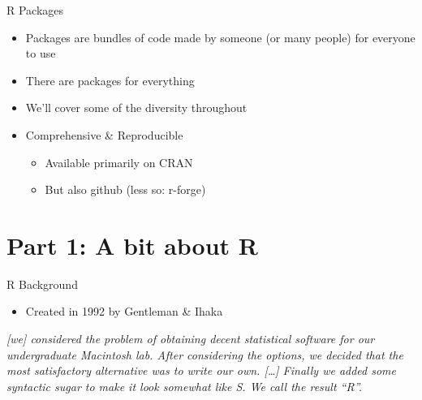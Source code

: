 \documentclass[
  ignorenonframetext,
]{beamer}
\providecommand{\tightlist}{%
  \setlength{\itemsep}{0pt}\setlength{\parskip}{0pt}}
\begin{document}
\begin{frame}{R Packages}
\protect\hypertarget{r-packages}{}

\begin{itemize}
\tightlist
\item
  Packages are bundles of code made by someone (or many people) for
  everyone to use
\item
  There are packages for everything
\item
  We'll cover some of the diversity throughout
\item
  Comprehensive \& Reproducible

  \begin{itemize}
  \tightlist
  \item
    Available primarily on CRAN
  \item
    But also github (less so: r-forge)
  \end{itemize}
\end{itemize}

\end{frame}

\hypertarget{part-1-a-bit-about-r}{%
\section{Part 1: A bit about R}\label{part-1-a-bit-about-r}}

\begin{frame}{R Background}
\protect\hypertarget{r-background}{}

\begin{itemize}
\tightlist
\item
  Created in 1992 by Gentleman \& Ihaka
\end{itemize}

\emph{{[}we{]} considered the problem of obtaining decent statistical
software for our undergraduate Macintosh lab. After considering the
options, we decided that the most satisfactory alternative was to write
our own. {[}\ldots{}{]} Finally we added some syntactic sugar to make it
look somewhat like S. We call the result ``R''.}

\end{frame}
\end{document}
